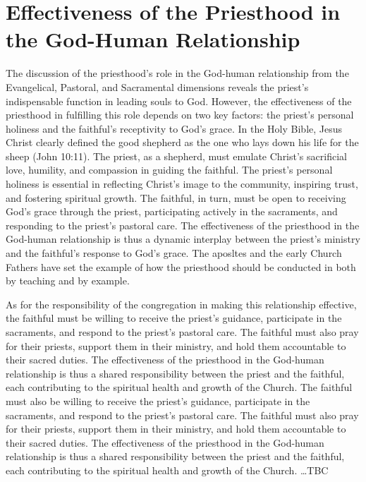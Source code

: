 \documentclass[12pt, doc]{apa7}   	%
\begin{document}
\section{Effectiveness of the Priesthood in the God-Human Relationship}
The discussion of the priesthood’s role in the God-human relationship from the Evangelical, Pastoral, and Sacramental dimensions reveals the priest’s indispensable function in leading souls to God. However, the effectiveness of the priesthood in fulfilling this role depends on two key factors: the priest’s personal holiness and the faithful’s receptivity to God’s grace.  In the Holy Bible, Jesus Christ clearly defined the good shepherd as the one who lays down his life for the sheep (John 10:11).  The priest, as a shepherd, must emulate Christ’s sacrificial love, humility, and compassion in guiding the faithful.  The priest’s personal holiness is essential in reflecting Christ’s image to the community, inspiring trust, and fostering spiritual growth.  The faithful, in turn, must be open to receiving God’s grace through the priest, participating actively in the sacraments, and responding to the priest’s pastoral care.  The effectiveness of the priesthood in the God-human relationship is thus a dynamic interplay between the priest’s ministry and the faithful’s response to God’s grace.  The aposltes and the early Church Fathers have set the example of how the priesthood should be conducted in both by teaching and by example. 

As for the responsibility of the congregation in making this relationship effective, the faithful must be willing to receive the priest’s guidance, participate in the sacraments, and respond to the priest’s pastoral care.  The faithful must also pray for their priests, support them in their ministry, and hold them accountable to their sacred duties.  The effectiveness of the priesthood in the God-human relationship is thus a shared responsibility between the priest and the faithful, each contributing to the spiritual health and growth of the Church.  The faithful must also be willing to receive the priest’s guidance, participate in the sacraments, and respond to the priest’s pastoral care.  The faithful must also pray for their priests, support them in their ministry, and hold them accountable to their sacred duties.  The effectiveness of the priesthood in the God-human relationship is thus a shared responsibility between the priest and the faithful, each contributing to the spiritual health and growth of the Church. \dots TBC
\end{document}
